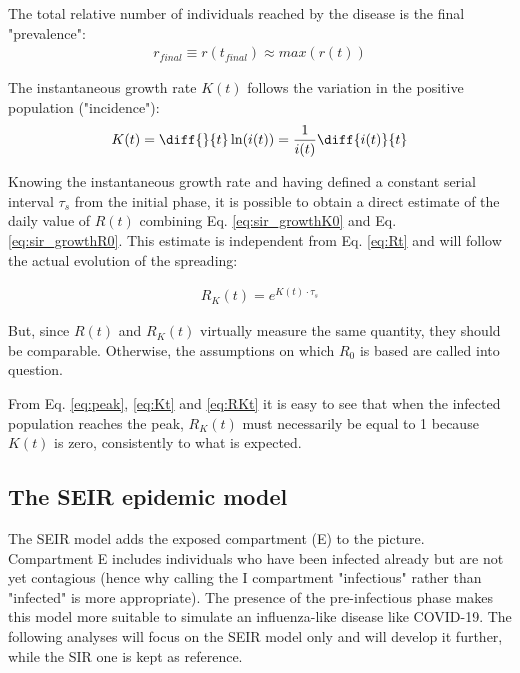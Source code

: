 \documentclass[DIV=12, BCOR=0pt]{scrartcl}  %
\begin{document}
The total relative number of individuals reached by the disease is the final "prevalence": 
\begin{align}
	r_{final} \equiv r(t_{final}) \approx max(r(t))
\end{align}
  
  The instantaneous growth rate $K(t)$ follows the variation in the positive population ("incidence"):
  \begin{align}
  	K(t) =  \diff{}{t} \ln(i(t)) = \frac{1}{i(t)} \diff{i(t)}{t} 
  	\label{eq:Kt}
  \end{align}

	Knowing the instantaneous growth rate and having defined a constant serial interval $\tau_s$ from the initial phase, it is possible to obtain a direct estimate of the daily value of $R(t)$ combining Eq. \ref{eq:sir_growthK0} and Eq. \ref{eq:sir_growthR0}. This estimate is independent from Eq. \ref{eq:Rt} and will follow the actual evolution of the spreading:

  \begin{align}
  	R_K(t) = e^{K(t) \cdot \tau_s}
  	\label{eq:RKt}
  \end{align}

	But, since $R(t)$ and $R_K(t)$ virtually measure the same quantity, they should be comparable. Otherwise, the assumptions on which $R_0$ is based are called into question.
  
  From Eq. \ref{eq:peak}, \ref{eq:Kt} and \ref{eq:RKt} it is easy to see that when the infected population reaches the peak, $R_K(t)$ must necessarily be equal to 1 because $K(t)$ is zero, consistently to what is expected.
  
  
  \subsection{The SEIR epidemic model}
  The SEIR model adds the exposed compartment (E) to the picture. Compartment E includes individuals who have been infected already but are not yet contagious (hence why calling the I compartment "infectious" rather than "infected" is more appropriate). The presence of the pre-infectious phase makes this model more suitable to simulate an influenza-like disease like COVID-19. The following analyses will focus on the SEIR model only and will develop it further, while the SIR one is kept as reference.
  
\end{document}
